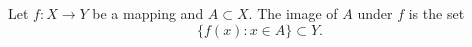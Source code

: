 Let $f: X \rightarrow Y$ be a mapping and $A \subset X$. The image of $A$ under $f$ is the set
$$\{f(x): x \in A\} \subset Y.$$
